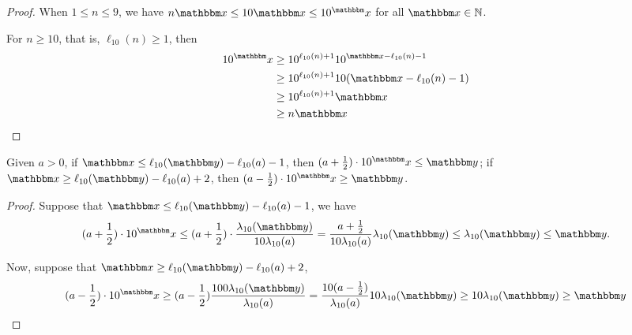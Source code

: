 \vspace*{-3mm}

\begin{proof}
When $1\le n\le 9$, we have $n\ivarx \le 10\ivarx \le 10^\ivarx$ for all $\ivarx \in\mathbb N$.

For $n\ge 10$, that is, $\ell_{10}(n)\ge 1$, then 
$$\begin{aligned}
10^\ivarx&\ge 10^{\ell_{10}(n)+1}10^{\ivarx-\ell_{10}(n)-1}\\
    &\ge 10^{\ell_{10}(n)+1}10(\ivarx-\ell_{10}(n)-1)\\
    &\ge 10^{\ell_{10}(n)+1}\ivarx\\
    &\ge n\ivarx
\end{aligned}$$
\end{proof}


\begin{proposition} \label{prop:case}
    Given $a>0$, 
    if $\ivarx\le \ell_{10}(\ivary)-\ell_{10}(a)-1$, then $(a+\frac{1}{2})\cdot 10^\ivarx\le\ivary$; 
    if $\ivarx\ge \ell_{10}(\ivary)-\ell_{10}(a)+2$, then $(a-\frac{1}{2})\cdot 10^\ivarx\ge\ivary$.
\end{proposition}

\begin{proof}

Suppose that $\ivarx\le \ell_{10}(\ivary)-\ell_{10}(a)-1$,
we have 
$$
(a+\frac{1}{2})\cdot 10^\ivarx \le (a+\frac{1}{2})\cdot \frac{\lambda_{10}(\ivary)}{10\lambda_{10}(a)}=\frac{a+\frac{1}{2}}{10\lambda_{10} (a)}\lambda_{10}(\ivary)\le\lambda_{10}(\ivary) \le \ivary. 
$$

Now, suppose that $\ivarx\ge \ell_{10}(\ivary)-\ell_{10}(a)+2$,
$$
(a-\frac{1}{2})\cdot 10^\ivarx \ge (a-\frac{1}{2})\frac{100\lambda_{10}(\ivary)}{\lambda_{10}(a)}=\frac{10(a-\frac{1}{2})}{\lambda_{10}(a)}10\lambda_{10}(\ivary)\ge 10\lambda_{10}(\ivary) \ge \ivary
$$
\end{proof}



